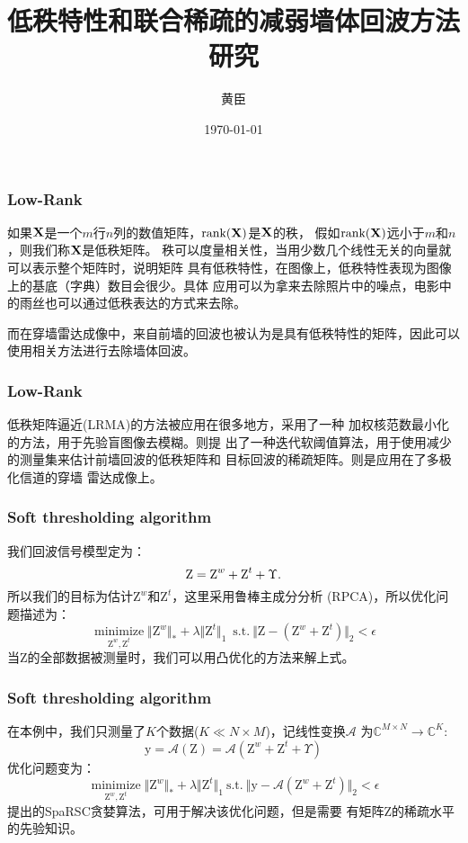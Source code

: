\documentclass[12pt]{beamer}
\begin{document}
 
\title{低秩特性和联合稀疏的减弱墙体回波方法研究}  
\author{黄臣}  
\date{\today}  
\frame{\titlepage}  
\begin{frame}
  \frametitle{Low-Rank}
  如果$\bf X$是一个$m$行$n$列的数值矩阵，$\rm {rank(}\bf X\rm {)}$是$\bf X$的秩，
  假如$\rm {rank(}\bf X\rm {)}$远小于$m$和$n$，则我们称$\bf X$是低秩矩阵。
  秩可以度量相关性，当用少数几个线性无关的向量就可以表示整个矩阵时，说明矩阵
  具有低秩特性，在图像上，低秩特性表现为图像上的基底（字典）数目会很少。具体
  应用可以为拿来去除照片中的噪点，电影中的雨丝也可以通过低秩表达的方式来去除。

  而在穿墙雷达成像中，来自前墙的回波也被认为是具有低秩特性的矩阵，因此可以
  使用相关方法进行去除墙体回波。
\end{frame}
\begin{frame}
  \frametitle{Low-Rank}
  低秩矩阵逼近(LRMA)的方法被应用在很多地方，\citep{Ren2016Image}采用了一种
  加权核范数最小化的方法，用于先验盲图像去模糊。\citep{Tang2016Radar}则提
  出了一种迭代软阈值算法，用于使用减少的测量集来估计前墙回波的低秩矩阵和
  目标回波的稀疏矩阵。\citep{Bouzerdoum2017A}则是应用在了多极化信道的穿墙
  雷达成像上。
\end{frame}
\begin{frame}
  \frametitle{Soft thresholding algorithm}
  我们回波信号模型定为：
  \begin{equation} 
	\text{Z}=\text Z^{w}+\text{Z}^{t}+\Upsilon.
  \end{equation}
  所以我们的目标为估计$\text{Z}^w$和$\text{Z}^{t}$，这里采用鲁棒主成分分析
  (RPCA)，所以优化问题描述为：
  \begin{equation} 
	\mathop{\text {minimize}}\limits_{\text{Z}^{w},\text{Z}^{t}} \Vert \text{Z}^{w}\Vert_{*}+\lambda\Vert \text{Z}^{t}\Vert_{1}\ \; \text{s.t}.\ \Vert \text{Z}-(\text{Z}^{w}+\text{Z}^{t})\Vert_{2} < \epsilon 
  \end{equation}
  当$\text{Z}$的全部数据被测量时，我们可以用凸优化的方法来解上式\citep{Chandrasekaran2009Rank}。 
\end{frame}
\begin{frame}
  \frametitle{Soft thresholding algorithm}
  在本例中，我们只测量了$K$个数据($K \ll N \times M$)，记线性变换$\mathcal{A}$
  为$\mathbb{C}^{M\times\!N}\to\mathbb{C}^{K}$:
  \begin{equation*}
	\text{y}=\mathcal{A}(\text{Z})=\mathcal{A}(\text{Z}^{w}+\text{Z}^{t}+\Upsilon)
  \end{equation*}
  优化问题变为：
  \begin{equation}
	\mathop{\text{minimize}}\limits_{\text{Z}^{w},\text{Z}^{t}} \Vert \text{Z}^{w}\Vert_{*}+\lambda\Vert \text{Z}^{t}\Vert_{1}\ \text{s.t}.\ \Vert \text{y}-\mathcal{A}(\text{Z}^{w}+\text{Z}^{t})\Vert_{2} < \epsilon
  \end{equation}
  \citep{Waters2011SpaRCS}提出的SpaRSC贪婪算法，可用于解决该优化问题，但是需要
  有矩阵$\text{Z}$的稀疏水平的先验知识。
\end{frame}
\end{document}
